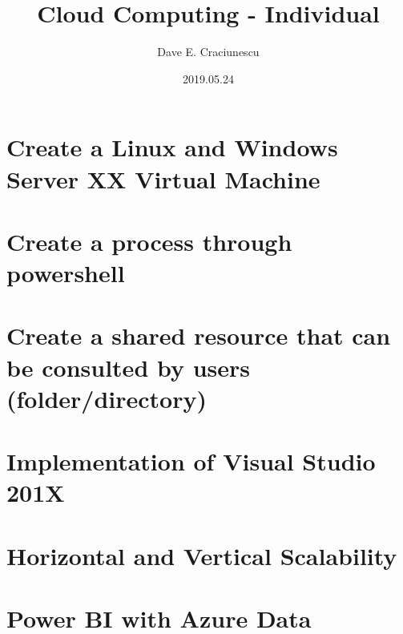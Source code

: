 \documentclass{article}
\title{Cloud Computing - Individual}
\author{Dave E. Craciunescu}
\date{2019.05.24}
\begin{document}
\maketitle

\section*{Create a Linux and Windows Server XX Virtual Machine}

\section*{Create a process through powershell}

\section*{Create a shared resource that can be consulted by users
(folder/directory)}

\section*{Implementation of Visual Studio 201X}

\section*{Horizontal and Vertical Scalability}

\section*{Power BI with Azure Data}
\end{document}
